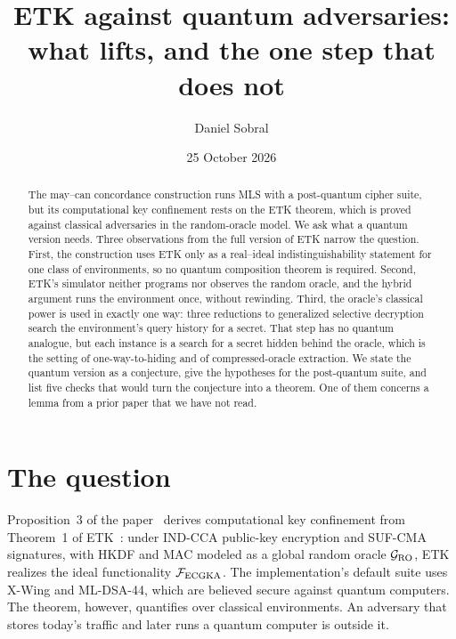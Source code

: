 \documentclass[aps,prx,reprint,superscriptaddress,nofootinbib,floatfix]{revtex4-2}
\theoremstyle{remark}
\newcommand{\F}{\mathcal F_{\rm ECGKA}}
\newcommand{\GRO}{\mathcal G_{\rm RO}}
\begin{document}
\title{ETK against quantum adversaries:\\ what lifts, and the one step that does not}

\author{Daniel Sobral}

\date{25 October 2026}

\begin{abstract}
The may--can concordance construction runs MLS with a post-quantum cipher suite, but its computational key confinement rests on the ETK theorem, which is proved against classical adversaries in the random-oracle model. We ask what a quantum version needs. Three observations from the full version of ETK narrow the question. First, the construction uses ETK only as a real--ideal indistinguishability statement for one class of environments, so no quantum composition theorem is required. Second, ETK's simulator neither programs nor observes the random oracle, and the hybrid argument runs the environment once, without rewinding. Third, the oracle's classical power is used in exactly one way: three reductions to generalized selective decryption search the environment's query history for a secret. That step has no quantum analogue, but each instance is a search for a secret hidden behind the oracle, which is the setting of one-way-to-hiding and of compressed-oracle extraction. We state the quantum version as a conjecture, give the hypotheses for the post-quantum suite, and list five checks that would turn the conjecture into a theorem. One of them concerns a lemma from a prior paper that we have not read.
\end{abstract}

\maketitle

\section{The question}

Proposition~3 of the paper~\cite{concordance} derives computational key confinement from Theorem~1 of ETK~\cite{etk}: under IND-CCA public-key encryption and SUF-CMA signatures, with HKDF and MAC modeled as a global random oracle $\GRO$, ETK realizes the ideal functionality $\F$. The implementation's default suite uses X-Wing and ML-DSA-44, which are believed secure against quantum computers. The theorem, however, quantifies over classical environments. An adversary that stores today's traffic and later runs a quantum computer is outside it.
\end{document}
